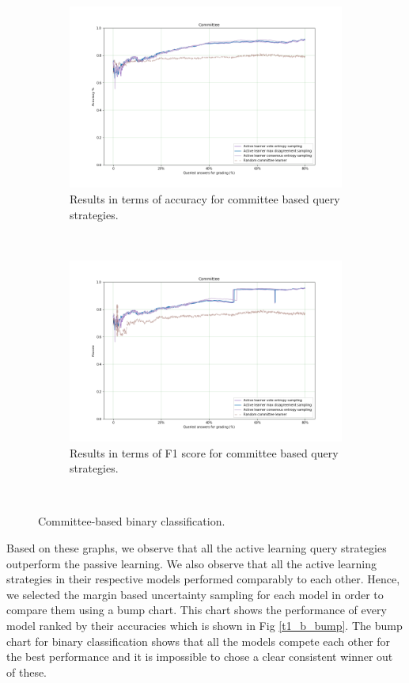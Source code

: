 	
	\begin{figure}[!htb]
		\begin{subfigure}[b]{0.5\textwidth}
			\includegraphics[width=\textwidth]{images/binary/task1_accuracy_com}
			\caption{Results in terms of accuracy for committee based query strategies.}
			\label{t1_b_com}
		\end{subfigure}
		~
		\begin{subfigure}[b]{0.5\textwidth}
			\includegraphics[width=\textwidth]{images/binary/task1_f1score_com}
			\caption{Results in terms of F1 score for committee based query strategies.}
			\label{t1_b_com_f1}
		\end{subfigure}
		~
		\caption{Committee-based binary classification.}
	\end{figure}
	
	Based on these graphs, we observe that all the active learning query strategies outperform the passive learning. We also observe that all the active learning strategies in their respective models performed comparably to each other. Hence, we selected the margin based uncertainty sampling for each model in order to compare them using a bump chart. This chart shows the performance of every model ranked by their accuracies which is shown in Fig \ref{t1_b_bump}. The bump chart for binary classification shows that all the models compete each other for the best performance and it is impossible to chose a clear consistent winner out of these. 
	
